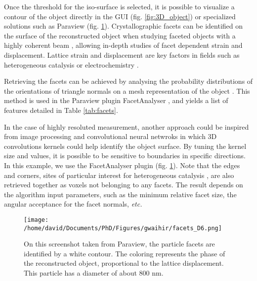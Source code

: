 Once the threshold for the iso-surface is selected, it is possible to visualize a contour of the object directly in the GUI (fig. \ref{fig:3D_object}) or specialized solutions such as Paraview \parencite{ahrens2005paraview} (fig. \ref{fig:facets_paraview}).
Crystallographic facets can be identified on the surface of the reconstructed object when studying faceted objects with a highly coherent beam \parencite{richard_crystallographic_2018}, allowing in-depth studies of facet dependent strain and displacement.
Lattice strain and displacement are key factors in fields such as heterogeneous catalysis \parencite{ulvestad_situ_2016,kim_active_2018,fernandez_situ_2019,Passos2020,Carnis2021} or electrochemistry \parencite{vicente_bragg_2021}.

Retrieving the facets can be achieved by analysing the probability distributions of the orientations of triangle normals on a mesh representation of the object \parencite{Grothausmann2012}.
This method is used in the Paraview plugin FacetAnalyser \parencite{Grothausmann_Beare2015}, and yields a list of features detailed in Table \ref{tab:facets}.

In the case of highly resoluted measurement, another approach could be inspired from  image processing and convolutional neural netwroks in which 3D convolutions kernels could help identify the object surface.
By tuning the kernel size and values, it is possible to be sensitive to boundaries in specific directions.
In this example, we use the FacetAnalyser plugin (fig. \ref{fig:facets_paraview}). Note that the edges and corners, sites of particular interest for heterogeneous catalysis \parencite{default_1925}, are also retrieved together as voxels not belonging to any facets.
The result depends on the algorithm input parameters, such as the minimum relative facet size, the angular acceptance for the facet normals, \textit{etc.}

\begin{figure}
    \centering
    \texttt{[image: /home/david/Documents/PhD/Figures/gwaihir/facets\_D6.png]}
    \caption{On this screenshot taken from Paraview, the particle facets are identified by a white contour. The coloring represents the phase of the reconstructed object, proportional to the lattice displacement. This particle has a diameter of about 800 nm.}
    \label{fig:facets_paraview}
\end{figure}

